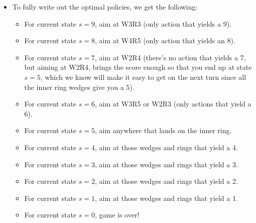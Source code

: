 \documentclass[12pt,letterpaper]{article}
\begin{document}
\begin{enumerate}[label={(\alph*) }]
\begin{itemize}
                        \item To fully write out the optimal policies, we get the following:\
                                \begin{itemize}
                                        \item For current state $s = 9$, aim at W3R3 (only action that yields a 9).
                                        \item For current state $s=8$, aim at W4R5 (only action that yields an 8).
                                        \item For current state $s=7$, aim at W2R4 (there's no action that yields a 7, but aiming at W2R4, brings the score enough so that you end up at state $s=5$, which we know will make it easy to get on the next turn since all the inner ring wedges give you a 5). 
                                        \item For current state $s=6$,
aim at W3R5 or W2R3 (only actions that yield a 6).
                                        \item For current state $s=5$, aim anywhere that lands on the inner ring. 
                                        \item For current state $s = 4$, aim at those wedges and rings that yield a 4.                                         \item For current state $s=3$, aim at those wedges and rings that yield a 3.                                        \item For current state $s=2$, aim at those wedges and rings that yield a 2. 
                                        \item For current state $s=1$,
aim at those wedges and rings that yield a 1.       
                                        \item For current state $s=0$, game is over!    
                          \end{itemize} 
 
                \end{itemize}
        \end{enumerate}
\end{document}
